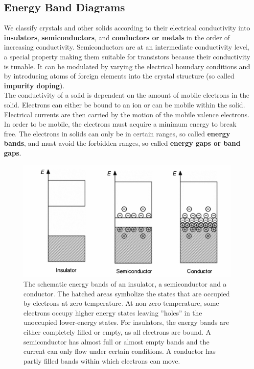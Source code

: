 \documentclass[main]{subfiles}
\begin{document}
\subsection{Energy Band Diagrams}
We classify crystals and other solids according to their electrical conductivity into \textbf{insulators}, \textbf{semiconductors}, and \textbf{conductors or metals} in the order of increasing conductivity. Semiconductors are at an intermediate conductivity level, a special property making them suitable for transistors because their conductivity is tunable. It can be modulated by varying the electrical boundary conditions and by introducing atoms of foreign elements into the crystal structure (so called \textbf{impurity doping}).\\
The conductivity of a solid is dependent on the amount of mobile electrons in the solid. Electrons can either be bound to an ion or can be mobile within the solid. Electrical currents are then carried by the motion of the mobile valence electrons. In order to be mobile, the electrons must acquire a minimum energy to break free. The electrons in solids can only be in certain ranges, so called \textbf{energy bands}, and must avoid the forbidden ranges, so called \textbf{energy gaps or band gaps}.

\begin{figure}[H]
\centering
\includegraphics[scale=0.5]{pics/energybands.png}
\caption{The schematic energy bands of an insulator, a semiconductor and a conductor. The hatched areas symbolize the states that are occupied by electrons at zero temperature. At non-zero temperature, some electrons occupy higher energy states leaving ''holes'' in the unoccupied lower-energy states. For insulators, the energy bands are either completely filled or empty, as all electrons are bound. A semiconductor has almost full or almost empty bands and the current can only flow under certain conditions. A conductor has partly filled bands within which electrons can move. }
\end{figure}
\end{document}
